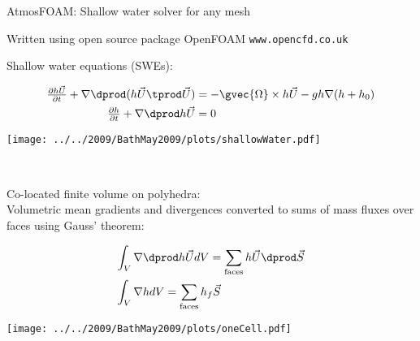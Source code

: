 \begin{slide}
{
    AtmosFOAM: Shallow water solver for any mesh
}

\vspace{20pt}
\begin{list0}

\item Written using open source package OpenFOAM {\tt www.opencfd.co.uk}

\vspace{-20pt}
\item
\begin{minipage}[t]{0.17\linewidth}\raggedright
Shallow water equations {\small(SWEs)}:
\end{minipage}
\begin{minipage}[c]{0.52\linewidth}\vspace{-10pt}\begin{align*}
    \tfrac{\partial h \vec{U}}{\partial t} + \nabla \dprod (h \vec{U} \tprod \vec{U})
    &= -\gvec{\Omega} \times h\vec{U} - g h \nabla (h + h_0) \\
    \tfrac{\partial h}{\partial t} + \nabla \dprod h \vec{U} &= 0
\end{align*}\end{minipage}
\begin{minipage}[c]{0.24\linewidth}\vspace{20pt}
\texttt{[image: ../../2009/BathMay2009/plots/shallowWater.pdf]}
\end{minipage}
\\  \vspace{-40pt}

\item
\begin{minipage}[t]{0.4\linewidth}\raggedright
    Co-located finite volume on polyhedra: \\
    Volumetric mean gradients and divergences converted to sums of mass fluxes over faces using Gauss' theorem:
\end{minipage}
\begin{minipage}[c]{0.28\linewidth}\vspace{40pt}\begin{align*}
\int_V \nabla & \dprod h\vec{U} dV = \sum_\text{faces}h\vec{U}\dprod \vec{S}\\
\int_V \nabla & h dV = \sum_\text{faces}h_f \vec{S}
\end{align*}\end{minipage}
\begin{minipage}[c]{0.25\linewidth}\vspace{50pt}
\texttt{[image: ../../2009/BathMay2009/plots/oneCell.pdf]}
\end{minipage}


\end{list0}
\end{slide}
